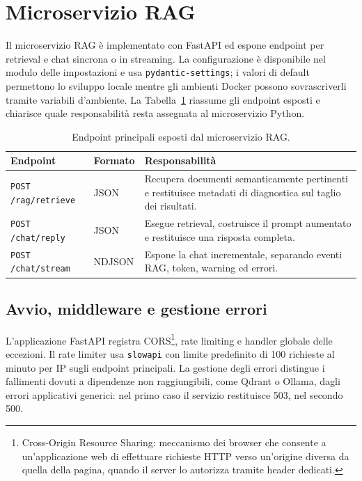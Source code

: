 \section{Microservizio RAG}
\label{sec:implementation_rag_service}

Il microservizio RAG è implementato con FastAPI ed espone endpoint per
retrieval e chat sincrona o in streaming. La configurazione è disponibile
nel modulo delle impostazioni e usa \texttt{pydantic-settings}; i 
valori di default permettono lo sviluppo locale mentre gli ambienti Docker 
possono sovrascriverli tramite variabili d'ambiente. La Tabella~\ref{tab:rag_service_endpoints} 
riassume gli endpoint esposti e chiarisce quale responsabilità resta assegnata al microservizio Python.

\begin{table}[ht]
  \centering
  \caption{Endpoint principali esposti dal microservizio RAG.}
  \label{tab:rag_service_endpoints}
  \small
  \begin{tabular}{p{3.6cm}p{2.2cm}p{7.2cm}}
    \toprule
    \textbf{Endpoint} & \textbf{Formato} & \textbf{Responsabilità} \\
    \midrule
    \texttt{POST /rag/retrieve}
      & JSON
      & Recupera documenti semanticamente pertinenti e restituisce metadati di
        diagnostica sul taglio dei risultati. \\
    \texttt{POST /chat/reply}
      & JSON
      & Esegue retrieval, costruisce il prompt aumentato e restituisce una
        risposta completa. \\
    \texttt{POST /chat/stream}
      & NDJSON
      & Espone la chat incrementale, separando eventi RAG, token, warning ed
        errori. \\
    \bottomrule
  \end{tabular}
\end{table}

\subsection{Avvio, middleware e gestione errori}
\label{subsec:implementation_fastapi}

L'applicazione FastAPI registra CORS\footnote{Cross-Origin Resource Sharing:
meccanismo dei browser che consente a un'applicazione web di effettuare
richieste HTTP verso un'origine diversa da quella della pagina, quando il server
lo autorizza tramite header dedicati.},
rate limiting e handler globale delle eccezioni. Il rate limiter usa
\texttt{slowapi} con limite predefinito di 100 richieste al minuto per IP sugli
endpoint principali. La gestione degli errori distingue i fallimenti dovuti a
dipendenze non raggiungibili, come Qdrant o Ollama, dagli errori applicativi
generici: nel primo caso il servizio restituisce 503, nel secondo 500.


